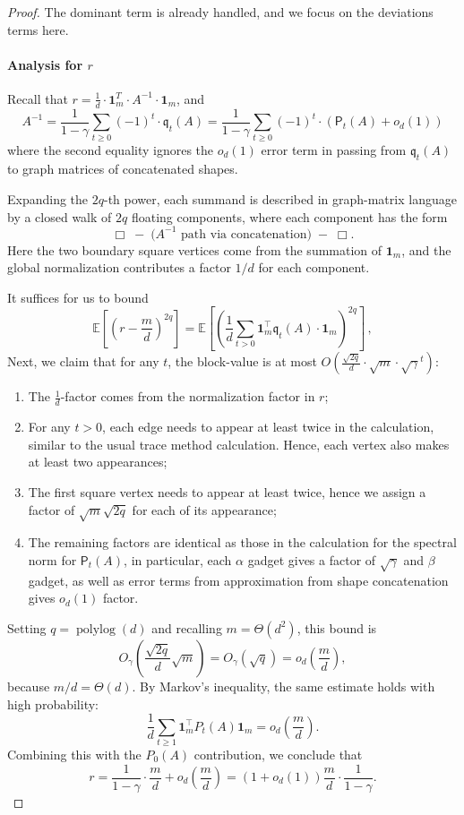 \documentclass[12pt]{article}
\def \E {\mathbb{E}}
\def \al {\alpha}
\def\1{\bm{1}}
\newcommand{\polylog}{\operatorname{polylog}}
\newcommand{\fp}{\mathsf{P}}
\newcommand{\q}{\mathfrak q}
\begin{document}
\HyperParameterBounds*
\begin{proof}
	The dominant term is already handled, and we focus on the deviations terms here.
	
	\paragraph{Analysis for $r$}
		Recall that $r = \frac{1}{d}  \cdot \1_m^T \cdot A^{-1} \cdot \1_m  $, and  \[ 
 	A^{-1} = \frac{1}{1-\gamma} \sum_{t\geq 0} (-1)^t \cdot \q_t(A)  = \frac{1}{1-\gamma} \sum_{t\geq 0} (-1)^t \cdot \left(\fp_t(A)+o_d(1) \right)
 	\]
 	where the second equality ignores the $o_d(1)$ error term in passing from $\q_t(A)$ to graph matrices of concatenated shapes.
	 
	 	Expanding the \(2q\)-th power, each summand is described in graph-matrix language by a closed walk of \(2q\) floating components, where each component has the form \[
    \Box
    \;-\;
    \bigl(A^{-1}\text{ path via concatenation}\bigr)
    \;-\;
    \Box .
\] Here the two boundary square vertices come from the summation of \(\mathbf 1_m\), and the global normalization contributes a factor \(1/d\) for each component.
	  
	  It suffices for us to bound \[
	 \E[(r - \frac{m}{d})^{2q} ] = \E[(\frac{1}{d} \sum_{t>0} \1_m^\top \q_t(A) \cdot \1_m)^{2q}]  
	 \,,\]  
	 Next, we claim that for any $t$, the block-value is at most \(O(\frac{\sqrt{2q}}{d}\cdot  \sqrt{m} \cdot \sqrt{\gamma}^t ) \):\begin{enumerate}
	 	\item The $\frac{1}{d}$-factor comes from the normalization factor in $r$;
	 	\item For any $t>0$, each edge needs to appear at least twice in the calculation, similar to the usual trace method calculation. Hence, each vertex also makes at least two appearances;
	 	\item The first square vertex needs to appear at least twice, hence we assign a factor of $\sqrt{m} \sqrt{2q}$ for each of its appearance;
	 	\item The remaining factors are identical as those in the calculation for the spectral norm for $\fp_t(A)$, in particular, each $\al$ gadget gives a factor of $\sqrt{\gamma}$ and $\beta$ gadget, as well as error terms from approximation from shape concatenation gives $o_d(1)$ factor.
	 \end{enumerate} 
	 Setting \(q=\polylog(d)\) and recalling  \(m=\Theta(d^2)\), this bound is \[ O_\gamma\!\left( \frac{\sqrt{2q}}{d}\sqrt m \right) = O_\gamma(\sqrt q) = o_d\!\left(\frac{m}{d}\right), \] because \(m/d=\Theta(d)\). By Markov's inequality, the same estimate holds with high probability: \[ \frac{1}{d}\sum_{t\ge 1}\mathbf 1_m^\top P_t(A)\mathbf 1_m = o_d\!\left(\frac{m}{d}\right). \] Combining this with the \(P_0(A)\) contribution, we conclude that \[ r = \frac{1}{1-\gamma}\cdot \frac{m}{d} + o_d\!\left(\frac{m}{d}\right) = (1+o_d(1))\frac{m}{d}\cdot \frac{1}{1-\gamma}. \]
	 

\end{proof}
\end{document}
